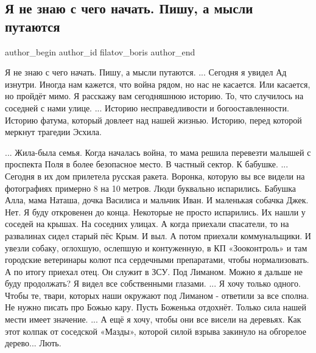  
 
 
 
 
 
\subsection{Я не знаю с чего начать. Пишу, а мысли путаются}
\label{sec:29_09_2022.fb.filatov_boris.1.s_chego_nachat}
 

\ifcmt
 author_begin
   author_id filatov_boris
 author_end
\fi

\obeycr
Я не знаю с чего начать.
Пишу, а мысли путаются.
...
Сегодня я увидел Ад изнутри.
Иногда нам кажется, что война рядом, но нас не касается.
Или касается, но пройдёт мимо.
Я расскажу вам сегодняшнюю историю.
То, что случилось на соседней с нами улице.
... 
Историю несправедливости и богооставленности.
Историю фатума, который довлеет над нашей жизнью.
Историю, перед которой меркнут трагедии Эсхила.
\restorecr


...
Жила-была семья. 
Когда началась война, то мама решила перевезти малышей с проспекта Поля в более безопасное место.
В частный сектор. К бабушке.
...
Сегодня в их дом прилетела русская ракета.
Воронка, которую вы все видели на фотографиях примерно 8 на 10 метров.
Люди буквально испарились. Бабушка Алла, мама Наташа, дочка Василиса  и мальчик Иван.
И маленькая собачка Джек.
Нет. Я буду откровенен до конца. Некоторые не просто испарились.
Их нашли у соседей на крышах. 
На соседних улицах.
А когда приехали спасатели, то на развалинах сидел старый пёс Крым.
И выл.
А потом приехали коммунальщики. 
И увезли собаку, оглохшую, ослепшую и контуженную, в КП «Зооконтроль» и там городские ветеринары колют пса сердечными препаратами, чтобы нормализовать.
А по итогу приехал отец.
Он служит в ЗСУ. Под Лиманом.
Можно я дальше не буду продолжать?
Я видел все собственными глазами.
...
Я хочу только одного.
Чтобы те, твари, которых наши окружают под Лиманом - ответили за все сполна.
Не нужно писать про Божью кару.
Пусть Боженька отдохнёт.
Только сила нашей мести имеет значение.
...
А ещё я хочу, чтобы они все висели на деревьях.
Как этот колпак от соседской «Мазды», которой силой взрыва закинуло на обгорелое дерево...
Лють.


